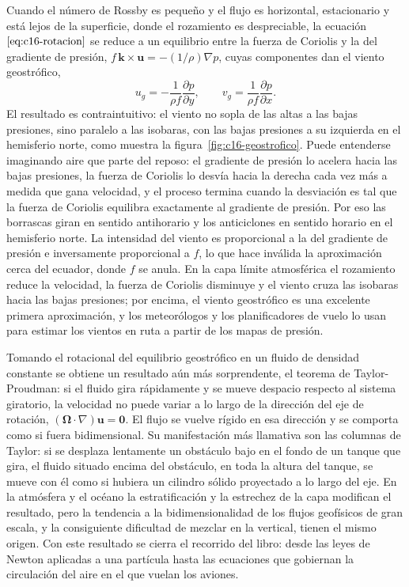 \documentclass[10pt,openany]{book}
\begin{document}
Cuando el número de Rossby es pequeño y el flujo es horizontal, estacionario y está lejos de la superficie, donde el rozamiento es despreciable, la ecuación \(\eqref{eq:c16-rotacion}\) se reduce a un equilibrio entre la fuerza de Coriolis y la del gradiente de presión, \(f\,\mathbf{k}\times\mathbf{u} = -(1/\rho)\nabla p\), cuyas componentes dan el viento geostrófico,
\begin{equation}
u_g = -\frac{1}{\rho f}\frac{\partial p}{\partial y}, \qquad v_g = \frac{1}{\rho f}\frac{\partial p}{\partial x}. \label{eq:c16-geostrofico}
\end{equation}
El resultado es contraintuitivo: el viento no sopla de las altas a las bajas presiones, sino paralelo a las isobaras, con las bajas presiones a su izquierda en el hemisferio norte, como muestra la figura~\ref{fig:c16-geostrofico}. Puede entenderse imaginando aire que parte del reposo: el gradiente de presión lo acelera hacia las bajas presiones, la fuerza de Coriolis lo desvía hacia la derecha cada vez más a medida que gana velocidad, y el proceso termina cuando la desviación es tal que la fuerza de Coriolis equilibra exactamente al gradiente de presión. Por eso las borrascas giran en sentido antihorario y los anticiclones en sentido horario en el hemisferio norte. La intensidad del viento es proporcional a la del gradiente de presión e inversamente proporcional a \(f\), lo que hace inválida la aproximación cerca del ecuador, donde \(f\) se anula. En la capa límite atmosférica el rozamiento reduce la velocidad, la fuerza de Coriolis disminuye y el viento cruza las isobaras hacia las bajas presiones; por encima, el viento geostrófico es una excelente primera aproximación, y los meteorólogos y los planificadores de vuelo lo usan para estimar los vientos en ruta a partir de los mapas de presión.

Tomando el rotacional del equilibrio geostrófico en un fluido de densidad constante se obtiene un resultado aún más sorprendente, el teorema de Taylor-Proudman: si el fluido gira rápidamente y se mueve despacio respecto al sistema giratorio, la velocidad no puede variar a lo largo de la dirección del eje de rotación, \((\boldsymbol{\Omega}\cdot\nabla)\mathbf{u} = \mathbf{0}\). El flujo se vuelve rígido en esa dirección y se comporta como si fuera bidimensional. Su manifestación más llamativa son las columnas de Taylor: si se desplaza lentamente un obstáculo bajo en el fondo de un tanque que gira, el fluido situado encima del obstáculo, en toda la altura del tanque, se mueve con él como si hubiera un cilindro sólido proyectado a lo largo del eje. En la atmósfera y el océano la estratificación y la estrechez de la capa modifican el resultado, pero la tendencia a la bidimensionalidad de los flujos geofísicos de gran escala, y la consiguiente dificultad de mezclar en la vertical, tienen el mismo origen. Con este resultado se cierra el recorrido del libro: desde las leyes de Newton aplicadas a una partícula hasta las ecuaciones que gobiernan la circulación del aire en el que vuelan los aviones.
\end{document}

